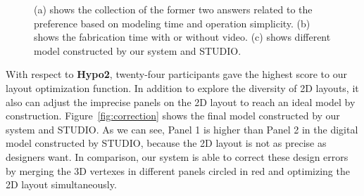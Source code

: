 \begin{figure}
	\centering
	\vspace{-1ex}
	\vspace{-1ex}
	\caption{(a) shows the collection of the former two answers related to the preference based on modeling time and operation simplicity. (b) shows the fabrication time with or without video. (c) shows different model constructed by our system and STUDIO. }
	\label{fig:userstudy}
\end{figure}

With respect to \textbf{Hypo2}, twenty-four participants gave the highest score to our layout optimization function. 
%
In addition to explore the diversity of 2D layouts, it also can adjust the imprecise panels on the 2D layout to reach an ideal model by construction. Figure~\ref{fig:correction} shows the final model constructed by our system and STUDIO. As we can see, Panel 1 is higher than Panel 2 in the digital model constructed by STUDIO, because the 2D layout is not as precise as designers want. 
%
In comparison, our system is able to correct these design errors by merging the 3D vertexes in different panels circled in red and optimizing the 2D layout simultaneously.


